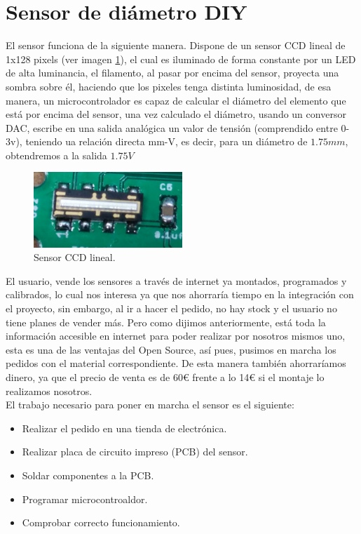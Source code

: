 \section{Sensor de diámetro DIY}
\label{sec:sensor}
El sensor funciona de la siguiente manera. Dispone de un sensor CCD lineal de 1x128 pixels (ver imagen \ref{fig:sens_CCD}), el cual es iluminado de forma constante por un LED de alta luminancia, el filamento, al pasar por encima del sensor, proyecta una sombra sobre él, haciendo que los pixeles tenga distinta luminosidad, de esa manera, un microcontrolador es capaz de calcular el diámetro del elemento que está por encima del sensor, una vez calculado el diámetro, usando un conversor DAC, escribe en una salida analógica un valor de tensión  (comprendido entre 0-3v), teniendo ua relación directa mm-V, es decir, para un diámetro de $1.75 mm$, obtendremos a la salida $1.75 V$\\
   \begin{figure}[H]
            \centering
            \includegraphics[width=0.5\textwidth]{images/sensor/IMG_20150414_135533_.jpg}
            \caption{Sensor CCD lineal.}
            \label{fig:sens_CCD}
    \end{figure}

El usuario, vende los sensores a través de internet ya montados, programados y calibrados, lo cual nos interesa ya que nos ahorraría tiempo en la integración con el proyecto, sin embargo, al ir a hacer el pedido, no hay stock y el usuario no tiene planes de vender más. Pero como dijimos anteriormente, está toda la información accesible en internet para poder realizar por nosotros mismos uno, esta es una de las ventajas del Open Source, así pues, pusimos en marcha los pedidos con el material correspondiente. De esta manera también ahorraríamos dinero, ya que el precio de venta es de 60\euro{} frente a lo 14\euro{} si el montaje lo realizamos nosotros.\\

El trabajo necesario para poner en marcha el sensor es el siguiente:

\begin{itemize}
\item{Realizar el pedido en una tienda de electrónica.}
\item{Realizar placa de circuito impreso (PCB) del sensor.}
\item{Soldar componentes a la PCB.}
\item{Programar microcontroaldor.}
\item{Comprobar correcto funcionamiento.}
\end{itemize}


